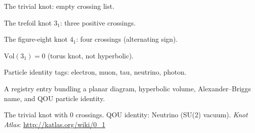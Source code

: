 \begin{definition}
  \label{def:unknot-diagram}
  \leanok
  The trivial knot: empty crossing list.
\end{definition}

\begin{definition}
  \label{def:trefoil-diagram}
  \leanok
  The trefoil knot $3_1$: three positive crossings.
\end{definition}

\begin{definition}
  \label{def:figure-eight-diagram}
  \leanok
  The figure-eight knot $4_1$: four crossings (alternating sign).
\end{definition}

\begin{definition}
  \label{def:vol-trefoil}
  \leanok
  $\mathrm{Vol}(3_1) = 0$ (torus knot, not hyperbolic).
\end{definition}

\begin{definition}
  \label{def:qou-identity}
  \leanok
  Particle identity tags: electron, muon, tau, neutrino, photon.
\end{definition}

\begin{definition}
  \label{def:knot-entry}
  \leanok
  A registry entry bundling a planar diagram, hyperbolic volume,
  Alexander--Briggs name, and QOU particle identity.
\end{definition}

\begin{definition}[Unknot ($0_1$)]
  \label{def:unknot}
  \leanok
  The trivial knot with 0 crossings.  QOU identity: Neutrino (SU(2) vacuum).
  \textit{Knot Atlas}: \url{http://katlas.org/wiki/0_1}
\end{definition}

